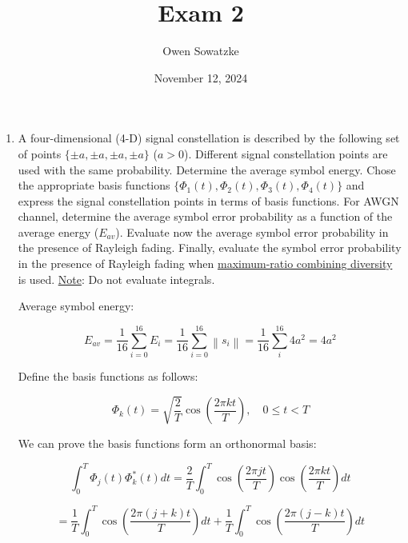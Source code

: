\documentclass[fleqn]{article}
\title{Exam 2}
\author{Owen Sowatzke}
\date{November 12, 2024}
\newcommand{\zerodisplayskip}{
	\setlength{\abovedisplayskip}{0pt}%
	\setlength{\belowdisplayskip}{0pt}%
	\setlength{\abovedisplayshortskip}{0pt}%
	\setlength{\belowdisplayshortskip}{0pt}%
	\setlength{\mathindent}{0pt}}
\newcommand{\norm}[1]{\left \lVert #1 \right \rVert}
\begin{document}
	\offinterlineskip
	\setlength{\lineskip}{12pt}
	\zerodisplayskip
	\maketitle
	
	\begin{enumerate}
		\item A four-dimensional (4-D) signal constellation is described by the following set of points $\{\pm a, \pm a, \pm a, \pm a\}$ ($a>0$). Different signal constellation points are used with the same probability. Determine the average symbol energy. Chose the appropriate basis functions $\{\Phi_1(t), \Phi_2(t), \Phi_3(t), \Phi_4(t)\}$ and express the signal constellation points in terms of basis functions. For AWGN channel, determine the average symbol error probability as a function of the average energy ($E_{av}$). Evaluate now the average symbol error probability in the presence of Rayleigh fading. Finally, evaluate the symbol error probability in the presence of Rayleigh fading when \underline{maximum-ratio combining diversity} is used. \underline{Note}: Do not evaluate integrals.

		Average symbol energy:
		
		\begin{equation*}
			E_{av} = \frac{1}{16}\sum_{i=0}^{16}{E_i} = \frac{1}{16}\sum_{i=0}^{16}{\norm{s_i}} = \frac{1}{16}\sum_{i}^{16}{4a^2} = 4a^2
		\end{equation*}
		
		Define the basis functions as follows:
		
		\begin{equation*}
			\Phi_k(t) = \sqrt{\frac{2}{T}}\cos\left(\frac{2{\pi}kt}{T}\right),\quad 0 \leq t < T
		\end{equation*}
		
		We can prove the basis functions form an orthonormal basis:
		
		\begin{equation*}
			\int_{0}^{T}{\Phi_j(t)\Phi_k^*(t)dt} = \frac{2}{T}\int_{0}^{T}{\cos\left(\frac{2{\pi}jt}{T}\right)\cos\left(\frac{2{\pi}kt}{T}\right)dt}
		\end{equation*}
		
		\begin{equation*}
			= \frac{1}{T}\int_{0}^{T}{\cos\left(\frac{2{\pi}(j+k)t}{T}\right)dt} + \frac{1}{T}\int_{0}^{T}{\cos\left(\frac{2{\pi}(j-k)t}{T}\right)dt}
		\end{equation*}
		

\end{enumerate}
\end{document}
